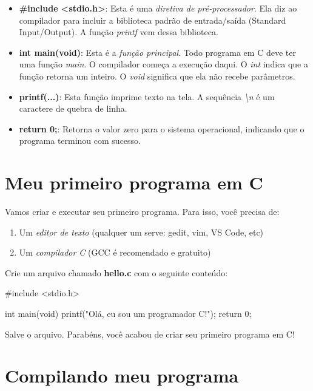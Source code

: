 \begin{itemize}
  \item \textbf{\#include <stdio.h>}: Esta é uma \textit{diretiva de pré-processador}. Ela diz ao compilador para incluir a biblioteca padrão de entrada/saída (Standard Input/Output). A função \textit{printf} vem dessa biblioteca.

  \item \textbf{int main(void)}: Esta é a \textit{função principal}. Todo programa em C deve ter uma função \textit{main}. O compilador começa a execução daqui. O \textit{int} indica que a função retorna um inteiro. O \textit{void} significa que ela não recebe parâmetros.

  \item \textbf{printf(...)}: Esta função imprime texto na tela. A sequência \textit{\textbackslash n} é um caractere de quebra de linha.

  \item \textbf{return 0;}: Retorna o valor zero para o sistema operacional, indicando que o programa terminou com sucesso.
\end{itemize}

\section{Meu primeiro programa em C}

Vamos criar e executar seu primeiro programa. Para isso, você precisa de:

\begin{enumerate}
  \item Um \textit{editor de texto} (qualquer um serve: gedit, vim, VS Code, etc)
  \item Um \textit{compilador C} (GCC é recomendado e gratuito)
\end{enumerate}

Crie um arquivo chamado \textbf{hello.c} com o seguinte conteúdo:

\begin{ccode}
  #include <stdio.h>

  int main(void)
  {
    printf("Olá, eu sou um programador C!\n");
    return 0;
  }
\end{ccode}

Salve o arquivo. Parabéns, você acabou de criar seu primeiro programa em C!

\section{Compilando meu programa}

